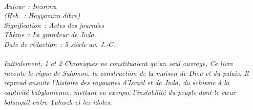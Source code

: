 \BFont
\noindent\hrulefill
{\footnotesize
\textit{
\bigskip
{\centering{}
\\Auteur~: Inconnu
\\(Heb.~: Hayyamim dibre)
\\Signification~: Actes des journées
\\Thème~: La grandeur de Juda
\\Date de rédaction~: 5 siècle av. J.-C.\\}
}
\textit{
\\Initialement, 1 et 2 Chroniques ne constituaient qu'un seul ouvrage. Ce livre raconte le règne de Salomon, la construction de la maison de Dieu et du palais. Il reprend ensuite l'histoire des royaumes d'Israël et de Juda, du schisme à la captivité babylonienne, mettant en exergue l'instabilité du peuple dont le cœur balançait entre Yahweh et les idoles.\bigskip
}
}
\par\nobreak\noindent\hrulefill
